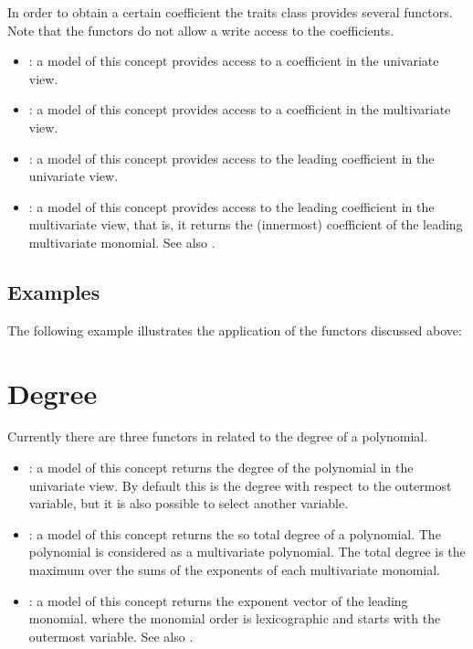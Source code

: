 In order to obtain a certain coefficient the traits class provides several functors. 
Note that the functors do not allow a write access to the coefficients. 
\begin{itemize}
\item {}: 
a model of this concept provides access to a coefficient in the univariate view. 
\item {}: 
a model of this concept provides access to a coefficient in the multivariate view.
\item {}: 
a model of this concept provides access to the leading coefficient in the univariate view. 
\item {}: 
a model of this concept provides access to the leading coefficient in the multivariate view, that is,
it returns the (innermost) coefficient of the leading multivariate monomial. 
See also  .          
\end{itemize}

\subsection{Examples}
The following example illustrates the application of the functors discussed above:



\section{Degree}

Currently there are three functors in  related to the degree of 
a polynomial. 
\begin{itemize}
\item {}: 
a model of this concept returns the degree of the polynomial in the univariate view. 
By default this is the degree with respect to the outermost variable, 
but it is also possible to select another variable. 
\item {}: 
a model of this concept returns the so total degree of a polynomial. The polynomial
is considered as a multivariate polynomial. The total degree is the maximum over 
the sums of the exponents of each multivariate monomial. 
\item {}:
a model of this concept returns the exponent vector of the leading monomial.  where the 
monomial order is lexicographic and starts with the outermost variable. 
See also  . 
\end{itemize}

